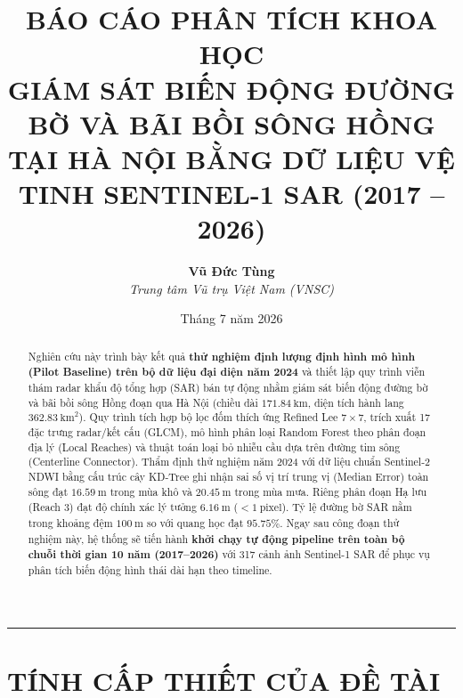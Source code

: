\documentclass[11pt,a4paper]{article}
\title{\textbf{\LARGE BÁO CÁO PHÂN TÍCH KHOA HỌC}\\[0.3em]
\Large GIÁM SÁT BIẾN ĐỘNG ĐƯỜNG BỜ VÀ BÃI BỒI SÔNG HỒNG TẠI HÀ NỘI BẰNG DỮ LIỆU VỆ TINH SENTINEL-1 SAR (2017 -- 2026)}
\author{\textbf{Vũ Đức Tùng}\\[0.2em]
\small \textit{Trung tâm Vũ trụ Việt Nam (VNSC)}}
\date{\small Tháng 7 năm 2026}
\begin{document}
\maketitle

\begin{abstract}
Nghiên cứu này trình bày kết quả \textbf{thử nghiệm định lượng định hình mô hình (Pilot Baseline) trên bộ dữ liệu đại diện năm 2024} và thiết lập quy trình viễn thám radar khẩu độ tổng hợp (SAR) bán tự động nhằm giám sát biến động đường bờ và bãi bồi sông Hồng đoạn qua Hà Nội (chiều dài $171.84~\text{km}$, diện tích hành lang $362.83~\text{km}^2$). Quy trình tích hợp bộ lọc đốm thích ứng Refined Lee $7\times7$, trích xuất 17 đặc trưng radar/kết cấu (GLCM), mô hình phân loại Random Forest theo phân đoạn địa lý (Local Reaches) và thuật toán loại bỏ nhiễu cầu dựa trên đường tim sông (Centerline Connector). Thẩm định thử nghiệm năm 2024 với dữ liệu chuẩn Sentinel-2 NDWI bằng cấu trúc cây KD-Tree ghi nhận sai số vị trí trung vị (Median Error) toàn sông đạt \textbf{$16.59~\text{m}$} trong mùa khô và \textbf{$20.45~\text{m}$} trong mùa mưa. Riêng phân đoạn Hạ lưu (Reach 3) đạt độ chính xác lý tưởng \textbf{$6.16~\text{m}$} ($< 1~\text{pixel}$). Tỷ lệ đường bờ SAR nằm trong khoảng đệm $100~\text{m}$ so với quang học đạt \textbf{$95.75\%$}. Ngay sau công đoạn thử nghiệm này, hệ thống sẽ tiến hành \textbf{khởi chạy tự động pipeline trên toàn bộ chuỗi thời gian 10 năm (2017--2026)} với 317 cảnh ảnh Sentinel-1 SAR để phục vụ phân tích biến động hình thái dài hạn theo timeline.
\end{abstract}

\hrule
\vspace{1em}

\section{TÍNH CẤP THIẾT CỦA ĐỀ TÀI}
\end{document}

